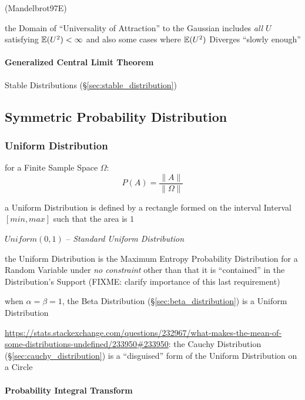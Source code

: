 (Mandelbrot97E)

the Domain of ``Universality of Attraction'' to the Gaussian includes \emph{all}
$U$ satisfying $\mathbb{E}(U^2) < \infty$ and also some cases where $\mathbb{E}(U^2)$
Diverges ``slowly enough''



\paragraph{Generalized Central Limit Theorem}\label{sec:gclt}\hfill

Stable Distributions (\S\ref{sec:stable_distribution})



\subsection{Symmetric Probability Distribution}
\label{sec:symmetric_probability}

\subsubsection{Uniform Distribution}\label{sec:uniform_distribution}

for a Finite Sample Space $\Omega$:
\[
  P(A) = \frac{\|A\|}{\|\Omega\|}
\]

a Uniform Distribution is defined by a rectangle formed on the interval Interval
$[min,max]$ such that the area is $1$

$Uniform(0,1)$ -- \emph{Standard Uniform Distribution}

the Uniform Distribution is the Maximum Entropy Probability Distribution for a
Random Variable under \emph{no constraint} other than that it is ``contained''
in the Distribution's Support (FIXME: clarify importance of this last
requirement)

when $\alpha = \beta = 1$, the Beta Distribution (\S\ref{sec:beta_distribution})
is a Uniform Distribution

\url{https://stats.stackexchange.com/questions/232967/what-makes-the-mean-of-some-distributions-undefined/233950#233950}:
the Cauchy Distribution (\S\ref{sec:cauchy_distribution}) is a ``disguised''
form of the Uniform Distribution on a Circle



\paragraph{Probability Integral Transform}
\label{sec:probability_integral_transform}\hfill

